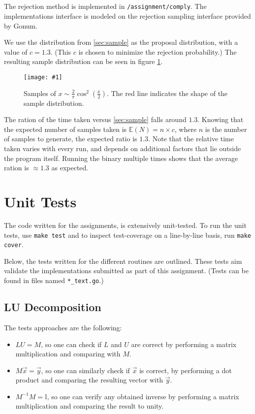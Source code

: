 \documentclass[10pt, a4paper]{article}
\newcommand{\plot}[3]{\begin{figure}[ht]\centering\texttt{[image: \#1]}\caption{#2}\label{#3}\end{figure}}
\begin{document}
  \subsection{}
  The rejection method is implemented in \texttt{/assignment/comply}. The implementations
  interface is modeled on the rejection sampling interface provided by Gonum.

  We use the distribution from \ref{sec:sample} as the proposal distribution, with a value
  of $c = 1.3$. (This $c$ is chosen to minimize the rejection probability\footnotemark{}.) The resulting
  sample distribution can be seen in figure \ref{fig:reject}.


  \plot{assignment-q-5-c}{
    Samples of $x \sim \frac{2}{\pi} \cos^2(\frac{x}{2})$. The red line indicates the shape of
    the sample distribution.
  }{fig:reject}

  The ration of the time taken versus \ref{sec:sample} falls around $1.3$. Knowing that the
  expected number of samples taken is $\mathbb{E}(N) = n \times c$, where $n$ is the number of samples
  to generate, the expected ratio is $1.3$. Note that the relative time taken varies with every run,
  and depends on additional factors that lie outside the program itself. Running the binary multiple
  times shows that the average ration is $\approx 1.3$ as expected.

{}


\appendix{}

\section{Unit Tests}
The code written for the assignments, is extensively unit-tested. To run the unit tests, use
\texttt{make test} and to inspect test-coverage on a line-by-line basis, run \texttt{make cover}.

Below, the tests written for the different routines are outlined. These tests aim validate the
implementations submitted as part of this assignment. (Tests can be found in files named
\texttt{*\_text.go}.)

  \subsection{LU Decomposition}
  The tests approaches are the following:
  \begin{itemize}
    \item $LU = M$, so one can check if $L$ and $U$ are correct by performing a matrix multiplication
    and comparing with $M$.
    \item $M\vec{x} = \vec{y}$, so one can similarly check if $\vec{x}$ is correct, by performing
    a dot product and comparing the resulting vector with $\vec{y}$.
    \item $M^{-1}M = \mathbb{I}$, so one can verify any obtained inverse by performing a matrix
    multiplication and comparing the result to unity.
  \end{itemize}
\end{document}
